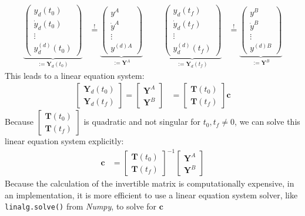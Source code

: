 \documentclass[a4paper,11pt,headings=standardclasses,parskip=half]{scrartcl}
\begin{document}
\begin{align*}
\underbrace{\begin{pmatrix} y_d(t_0) \\ \dot{y}_d(t_0) \\ \vdots \\ y_d^{(d)}(t_0) \end{pmatrix}}_{:=\mathbf{Y}_d(t_0)}
&\overset{!}{=}
\underbrace{\begin{pmatrix} y^A \\ \dot{y}^A \\ \vdots \\ y^{(d)A}  \end{pmatrix}}_{:=\mathbf{Y}^A}
&&&
\underbrace{\begin{pmatrix} y_d(t_f) \\ \dot{y}_d(t_f) \\ \vdots \\ y_d^{(d)}(t_f) \end{pmatrix}}_{:=\mathbf{Y}_d(t_f)}
&\overset{!}{=}
\underbrace{\begin{pmatrix} y^B \\ \dot{y}^B \\ \vdots \\ y^{(d)B}  \end{pmatrix}}_{:=\mathbf{Y}^B}
\end{align*}
This leads to a linear equation system:
\begin{align*}
\begin{bmatrix}
\mathbf{Y}_d(t_0) \\
\mathbf{Y}_d(t_f) 
\end{bmatrix}
=
\begin{bmatrix}
\mathbf{Y}^A \\
\mathbf{Y}^B
\end{bmatrix}
&=
\begin{bmatrix}
\mathbf{T}(t_0) \\
\mathbf{T}(t_f) 
\end{bmatrix}
\mathbf{c}
\end{align*}
Because $\begin{bmatrix}
\mathbf{T}(t_0) \\
\mathbf{T}(t_f) 
\end{bmatrix}$ is quadratic and not singular for $t_0,t_f\neq 0$, we can solve this linear equation system explicitly:
\begin{align}
\label{eq:2}
\mathbf{c} &= \begin{bmatrix}
\mathbf{T}(t_0) \\
\mathbf{T}(t_f) 
\end{bmatrix}^{-1}
\begin{bmatrix}
\mathbf{Y}^A \\
\mathbf{Y}^B
\end{bmatrix}
\end{align}
Because the calculation of the invertible matrix is computationally expensive, in an implementation, it is more efficient to use a linear equation system solver, like \texttt{linalg.solve()} from \emph{Numpy}, to solve for $\mathbf{c}$
\end{document}
